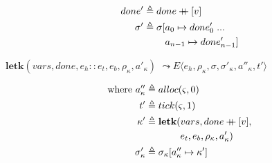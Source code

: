 \documentclass[12pt,draft]{article}
\newcommand\mdoubleplus{\ensuremath{\mathbin{+\mkern-9mu+}}}
\begin{document}
\begin{multicols*}{2}
\begin{align*}
  done' &\triangleq done \mdoubleplus [v] \\
  \sigma' &\triangleq \sigma[a_0 \mapsto done'_0\;...\\
                    &\;\;\;\;\;\;\;\;a_{n-1} \mapsto done'_{n-1}]
\end{align*}
\begin{center}
  $\textbf{letk}(vars, done, e_h::e_t , e_b , \rho_\kappa, a'_\kappa)$
  $\leadsto E\langle e_h , \rho_\kappa , \sigma , \sigma'_\kappa , a''_\kappa , t' \rangle$
\end{center}
\vspace{-7mm}
\begin{align*}
  \text{where }
  a''_\kappa &\triangleq alloc(\varsigma, 0) \\
  t' &\triangleq tick(\varsigma, 1) \\
  \kappa' &\triangleq \textbf{letk}(vars, done \mdoubleplus [v], \\
             &\;\;\;\;\;\;\;\;\;\;\;\;\;e_t, e_b, \rho_\kappa, a'_\kappa) \\
  \sigma'_\kappa &\triangleq \sigma_\kappa[a''_\kappa \mapsto \kappa']
\end{align*}

\vfill\null
\columnbreak



\end{multicols*}
\end{document}
